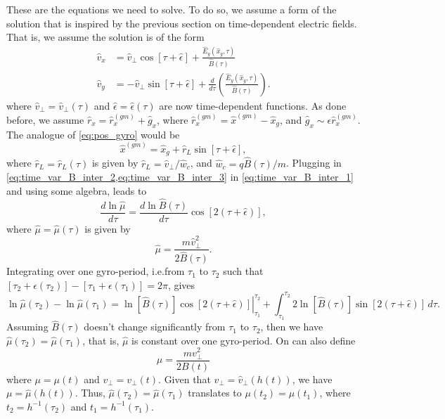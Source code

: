 \documentclass[oneside,a4paper,11pt]{report}
\begin{document}
These are the equations we need to solve. To do so, we assume a form of the solution that is inspired by the previous section on time-dependent electric fields. That is, we assume the solution is of the form
\begin{align}
\label{eq:time_var_B_inter_2}
    \hat{v}_x &= \hat{v}_\perp \cos[\tau + \hat{\epsilon}] + \frac{\hat{E}_y(\hat{x}_g,\tau)}{\hat{B}(\tau)} \nonumber \\
    \hat{v}_y &= -\hat{v}_\perp \sin[\tau + \hat{\epsilon}]+ \frac{d}{d \tau} \left ( \frac{\hat{E}_y(\hat{x}_g,\tau)}{\hat{B}(\tau)} \right ).
\end{align}
where $\hat{v}_\perp = \hat{v}_\perp(\tau)$ and $\hat{\epsilon} = \hat{\epsilon}(\tau)$ are now time-dependent functions. As done before, we assume $\hat{r}_x = \hat{r}_x^{(gm)} + \hat{g}_x$, where $\hat{r}_x^{(gm)} = \hat{x}^{(gm)} - \hat{x}_g$, and $\hat{g}_x \sim \epsilon \hat{r}_x^{(gm)}$. The analogue of \cref{eq:pos_gyro} would be 
\begin{equation}
\label{eq:time_var_B_inter_3}
    \hat{x}^{(gm)} = \hat{x}_g + \hat{r}_L \sin [\tau + \hat{\epsilon}],
\end{equation}
where $\hat{r}_L = \hat{r}_L(\tau)$ is given by $\hat{r}_L = \hat{v}_\perp / \hat{w}_c$, and $\hat{w}_c = q\hat{B}(\tau)/m$. Plugging in \cref{eq:time_var_B_inter_2,eq:time_var_B_inter_3} in \cref{eq:time_var_B_inter_1} and using some algebra, leads to
\begin{equation}
\frac{d \ln \hat{\mu}}{d\tau} = \frac{d \ln \hat{B}(\tau)}{d\tau} \cos [ 2 (\tau + \hat{\epsilon}) ],
\end{equation}
where $\hat{\mu} = \hat{\mu}(\tau)$ is given by
\begin{equation}
    \hat{\mu} = \frac{m \hat{v}_\perp^2}{2\hat{B}(\tau)}.
\end{equation}
Integrating over one gyro-period, i.e.\@ from $\tau_1$ to $\tau_2$ such that $[\tau_2 + \epsilon(\tau_2)] - [\tau_1 + \epsilon(\tau_1)] = 2\pi$, gives
\begin{equation}
    \ln \hat{\mu}(\tau_2) - \ln \hat{\mu}(\tau_1) = \left. \ln [\hat{B}(\tau)] \cos [2 (\tau+\hat{\epsilon})] \right |_{\tau_1}^{\tau_2} + \int_{\tau_1}^{\tau_2} 2 \ln [\hat{B}(\tau)] \sin[2(\tau+\hat{\epsilon})] \, d\tau.
\end{equation}
Assuming $\hat{B}(\tau)$ doesn't change significantly from $\tau_1$ to $\tau_2$, then we have $\hat{\mu}(\tau_2) = \hat{\mu}(\tau_1)$, that is, $\hat{\mu}$ is constant over one gyro-period. On can also define
\begin{equation}
    \mu = \frac{m v_\perp^2}{2 B(t)}
\end{equation}
where $\mu = \mu(t)$ and $v_\perp = v_\perp(t)$. Given that $v_\perp = \hat{v}_\perp(h(t))$, we have $\mu = \hat{\mu}(h(t))$. Thus, $\hat{\mu}(\tau_2) = \hat{\mu}(\tau_1)$ translates to $\mu(t_2) = \mu(t_1)$, where $t_2 = h^{-1}(\tau_2)$ and $t_1 = h^{-1}(\tau_1)$.
\end{document}

